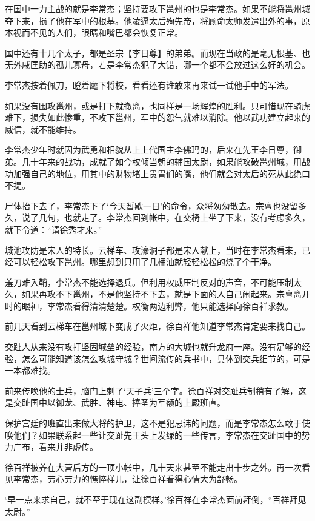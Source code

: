 在国中一力主战的就是李常杰；坚持要攻下邕州的也是李常杰。如果不能将邕州城夺下来，损了他在军中的根基。他凌逼太后殉先帝，将顾命太师发遣出外的事，原本视而不见的人们，眼睛和嘴巴都会恢复正常。

国中还有十几个太子，都是圣宗【李日尊】的弟弟。而现在当政的是毫无根基、也无外戚匡助的孤儿寡母，若是李常杰犯了大错，哪一个都不会放过这么好的机会。

李常杰按着佩刀，瞪着麾下将校，看看还有谁敢来再来试一试他手中的军法。

如果没有围攻邕州，或是打下就撤离，也同样是一场辉煌的胜利。只可惜现在骑虎难下，损失如此惨重，不攻下邕州，军中的怨气就难以消除。他以武功建立起来的威信，就不能维持。

李常杰少年时就因为武勇和相貌从上上代国主李佛玛的，后来在先王李日尊，御弟。几十年来的战功，成就了如今权倾当朝的辅国太尉，如果能攻破邕州城，用战功加强自己的地位，用其中的财物堵上贵胄们的嘴，他们就会对太后的死从此绝口不提。

尸体抬下去了，李常杰下了‘今天暂歇一日’的命令，众将匆匆散去。宗亶也没留多久，说了几句，也就走了。李常杰回到帐中，在交椅上坐了下来，没有考虑多久，就下令道：“请徐秀才来。”

城池攻防是宋人的特长。云梯车、攻濠洞子都是宋人献上，当时在李常杰看来，已经可以轻松攻下邕州。哪里想到只用了几桶油就轻轻松松的烧了个干净。

羞刀难入鞘，李常杰不能选择退兵。但利用权威压制反对的声音，不可能压制太久，如果再攻不下邕州，不是他坚持不下去，就是下面的人自己闹起来。宗亶离开时的眼神，李常杰看得清清楚楚。权衡两边利弊，他只能选择向徐百祥求教。

前几天看到云梯车在邕州城下变成了火炬，徐百祥他知道李常杰肯定要来找自己。

交趾人从来没有攻打坚固城垒的经验，南方的大城也就升龙府一座。没有足够的经验，怎么可能知道该怎么攻城守城？世间流传的兵书中，具体到交兵细节的，可是一本都难找。

前来传唤他的士兵，脑门上刺了‘天子兵’三个字。徐百祥对交趾兵制稍有了解，这是交趾国中以御龙、武胜、神电、捧圣为军额的上殿班直。

保护宫廷的班直出来做大将的护卫，这不是犯忌讳的问题，而是李常杰怎么敢于使唤他们？如果联系起一些让交趾先王头上发绿的一些传言，李常杰在交趾国中的势力广布，看来并非虚传。

徐百祥被养在大营后方的一顶小帐中，几十天来甚至不能走出十步之外。再一次看见李常杰，劳心劳力的憔悴样儿，让徐百祥看得心情大为舒畅。

‘早一点来求自己，就不至于现在这副模样。’徐百祥在李常杰面前拜倒，“百祥拜见太尉。”

